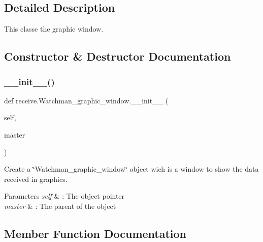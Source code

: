 \subsection{Detailed Description}
This classe the graphic window. 

\subsection{Constructor \& Destructor Documentation}
\mbox{\label{classreceive_1_1_watchman__graphic__window_ab37e9e313e24f7048041e71a7f170137}} 
\subsubsection{\texorpdfstring{\_\_init\_\_()}{\_\_init\_\_()}}
{\footnotesize\ttfamily def receive.\+Watchman\+\_\+graphic\+\_\+window.\+\_\+\+\_\+init\+\_\+\+\_\+ (\begin{DoxyParamCaption}\item[{}]{self,  }\item[{}]{master }\end{DoxyParamCaption})}



Create a \char`\"{}\+Watchman\+\_\+graphic\+\_\+window\char`\"{} object wich is a window to show the data received in graphics. 


\begin{DoxyParams}{Parameters}
{\em self} & \+: The object pointer \\
\hline
{\em master} & \+: The parent of the object \\
\hline
\end{DoxyParams}


\subsection{Member Function Documentation}
\mbox{\label{classreceive_1_1_watchman__graphic__window_ad9b67ca0a3b3f09f9e19459e62952eea}} 
